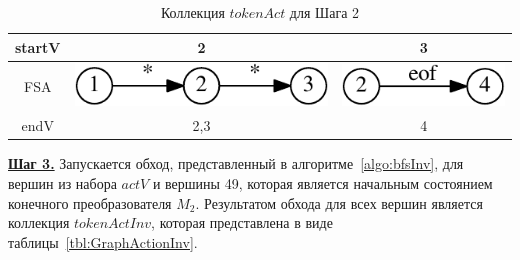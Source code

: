 \documentclass[10pt, conference, compsocconf]{IEEEtran}
\begin{document}
\begin{table}[h]
  \vspace{2 mm}
  \begin{tabular}{ | c | c | c | }
    \hline
    startV & 2 & 3 \\ \hline
    FSA
    &
    \begin{minipage}{.15\textwidth}
    \vspace{1 mm}
      \includegraphics[width=\linewidth]{pics/20_tok}
    \end{minipage}
    & 
    \begin{minipage}{.15\textwidth}
    \vspace{1 mm}
      \includegraphics[width=\linewidth]{pics/35_tok}
    \end{minipage}    
    \\ \hline
    endV & 2,3 & 4
    \\ \hline
  \end{tabular}
  \caption{Коллекция $tokenAct$ для Шага 2}
  \label{tbl:GraphAction}
\end{table}

\textbf{\underline{Шаг 3.}} Запускается обход, представленный в алгоритме~\ref{algo:bfsInv}, для вершин из набора $actV$ и вершины 49, которая является начальным состоянием конечного преобразователя $M_2$. Результатом обхода для всех вершин является коллекция $tokenActInv$, которая представлена в виде таблицы~\ref{tbl:GraphActionInv}. 
\end{document}
